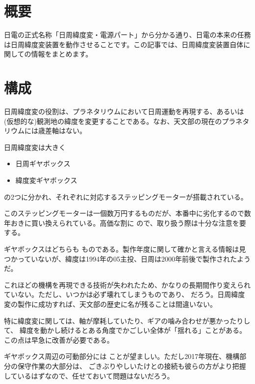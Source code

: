 \documentclass[letterpaper,10pt,dvipdfmx]{sphinxmanual}
\begin{document}
\section{概要}
\label{\detokenize{nissyu-idohen/kikou:}}\label{\detokenize{nissyu-idohen/kikou:id2}}
日電の正式名称「日周緯度変・電源パート」から分かる通り、日電の本来の任務は日周緯度変装置を動作させることです。この記事では、日周緯度変装置自体に関しての情報をまとめます。


\section{構成}
\label{\detokenize{nissyu-idohen/kikou:}}\label{\detokenize{nissyu-idohen/kikou:id3}}
日周緯度変の役割は、プラネタリウムにおいて日周運動を再現する、あるいは(仮想的な)観測地の緯度を変更することである。なお、天文部の現在のプラネタリウムには歳差軸はない。

日周緯度変は大きく
\begin{itemize}
\item {} 
日周ギヤボックス

\item {} 
緯度変ギヤボックス

\end{itemize}

の2つに分かれ、それぞれに対応するステッピングモーターが搭載されている。

このステッピングモーターは一個数万円するものだが、本番中に劣化するので数年おきに買い換えられている。高価な割に ので、取り扱う際は十分な注意を要する。

ギヤボックスはどちらも ものである。製作年度に関して確かと言える情報は見つかっていないが、緯度は1994年の05主投、日周は2000年前後で製作されたようだ。

これほどの機構を再現できる技術が失われたため、かなりの長期間作り変えられていない。ただし、いつかは必ず壊れてしまうものであり、 だろう。日周緯度変の製作に成功すれば、天文部の歴史に名が残ることは間違いない。

特に緯度変に関しては、軸が摩耗していたり、ギアの噛み合わせが悪かったりして、
緯度を動かし続けるとある角度でかごしい全体が「揺れる」ことがある。この点は早急に改善が必要である。

ギヤボックス周辺の可動部分には ことが望ましい。ただし2017年現在、機構部分の保守作業の大部分は、 ごきぶりやしいたけとの接続も彼らの方がより把握しているはずなので、任せておいて問題はないだろう。
\end{document}
